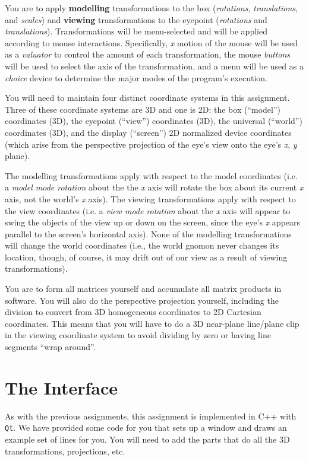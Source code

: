 You are to apply {\bf modelling} transformations to the box
({\it rotations}, {\it translations}, and {\it scales})
and {\bf viewing} transformations to the eyepoint
({\it rotations} and {\it translations}).
Transformations will be menu-selected
and will be applied
according to mouse interactions.
Specifically, {\it x} motion of the mouse will be used
as a {\it valuator} to control the amount of each transformation,
the mouse {\it buttons} will be used to select the axis of the
transformation, and a menu will be used as a {\it choice} device
to determine the major modes of the
program's execution.

You will need to maintain 
four distinct coordinate systems in this assignment.
Three of these coordinate systems are 3D and one is 2D:
the box (``model'') coordinates (3D), the eyepoint (``view'') coordinates (3D),
the universal (``world'') coordinates (3D), and the display (``screen'')
2D normalized device coordinates (which arise from the perspective projection
of the eye's view onto the eye's {\it x}, {\it y\/} plane).

The modelling transformations apply with respect to the
model coordinates (i.e. a {\it model mode rotation} about the the 
{\it x\/} axis
will rotate the box about its current {\it x\/} axis, not the world's
{\it x\/} axis).
The viewing transformations apply with respect to the view coordinates
(i.e. a {\it view mode rotation} about the {\it x\/} axis will appear
to swing the objects of the view up or down on the screen, since
the eye's {\it x\/} appears parallel to the screen's horizontal axis).
None of the modelling transformations will change the world coordinates
(i.e., the world gnomon never changes its location, though, of course,
it may drift out of our view as a result of viewing transformations).

You are to form all matrices yourself and accumulate all matrix products
in software.  You will also do the perspective projection yourself, 
including the division to convert from 3D homogeneous coordinates to 2D
Cartesian coordinates.  This means that you will have to do a 3D near-plane
line/plane clip in the viewing coordinate system to avoid dividing by zero or
having line segments ``wrap around''.

\section{The Interface}

As with the previous assignments, this assignment is implemented in
C++ with \texttt{Qt}. We have provided some code for you that sets
up a window and draws an example set of lines for you. You will need
to add the parts that do all the 3D transformations, projections,
etc.

